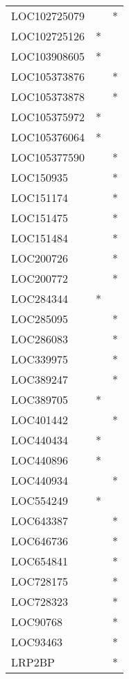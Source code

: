 \begin{longtable}{lcc}
LOC102725079   &           &       * \\
LOC102725126   &         * &         \\
LOC103908605   &         * &         \\
LOC105373876   &           &       * \\
LOC105373878   &           &       * \\
LOC105375972   &         * &         \\
LOC105376064   &         * &         \\
LOC105377590   &           &       * \\
LOC150935      &           &       * \\
LOC151174      &           &       * \\
LOC151475      &           &       * \\
LOC151484      &           &       * \\
LOC200726      &           &       * \\
LOC200772      &           &       * \\
LOC284344      &         * &         \\
LOC285095      &           &       * \\
LOC286083      &           &       * \\
LOC339975      &           &       * \\
LOC389247      &           &       * \\
LOC389705      &         * &         \\
LOC401442      &           &       * \\
LOC440434      &         * &         \\
LOC440896      &         * &         \\
LOC440934      &           &       * \\
LOC554249      &         * &         \\
LOC643387      &           &       * \\
LOC646736      &           &       * \\
LOC654841      &           &       * \\
LOC728175      &           &       * \\
LOC728323      &           &       * \\
LOC90768       &           &       * \\
LOC93463       &           &       * \\
LRP2BP         &           &       * \\

\end{longtable}
